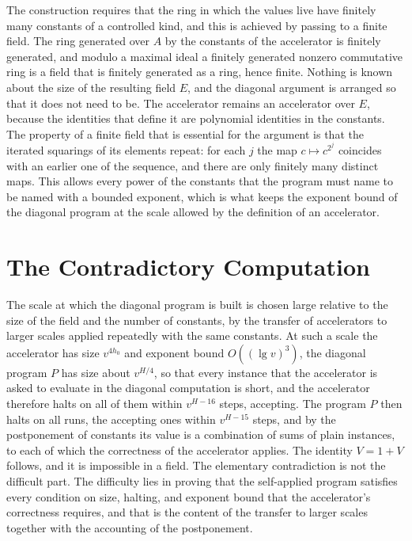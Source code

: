 \documentclass[11pt,letterpaper]{report}
\theoremstyle{plain}
\theoremstyle{definition}
\theoremstyle{remark}
\begin{document}
The construction requires that the ring in which the values live have finitely many constants of a controlled kind, and this is achieved by passing to a finite field. The ring generated over $A$ by the constants of the accelerator is finitely generated, and modulo a maximal ideal a finitely generated nonzero commutative ring is a field that is finitely generated as a ring, hence finite. Nothing is known about the size of the resulting field $E$, and the diagonal argument is arranged so that it does not need to be. The accelerator remains an accelerator over $E$, because the identities that define it are polynomial identities in the constants. The property of a finite field that is essential for the argument is that the iterated squarings of its elements repeat: for each $j$ the map $c\mapsto c^{2^j}$ coincides with an earlier one of the sequence, and there are only finitely many distinct maps. This allows every power of the constants that the program must name to be named with a bounded exponent, which is what keeps the exponent bound of the diagonal program at the scale allowed by the definition of an accelerator.

\section{The Contradictory Computation}

The scale at which the diagonal program is built is chosen large relative to the size of the field and the number of constants, by the transfer of accelerators to larger scales applied repeatedly with the same constants. At such a scale the accelerator has size $v^{4h_0}$ and exponent bound $O((\lg v)^3)$, the diagonal program $P$ has size about $v^{H/4}$, so that every instance that the accelerator is asked to evaluate in the diagonal computation is short, and the accelerator therefore halts on all of them within $v^{H-16}$ steps, accepting. The program $P$ then halts on all runs, the accepting ones within $v^{H-15}$ steps, and by the postponement of constants its value is a combination of sums of plain instances, to each of which the correctness of the accelerator applies. The identity $V=1+V$ follows, and it is impossible in a field. The elementary contradiction is not the difficult part. The difficulty lies in proving that the self-applied program satisfies every condition on size, halting, and exponent bound that the accelerator's correctness requires, and that is the content of the transfer to larger scales together with the accounting of the postponement.
\end{document}
